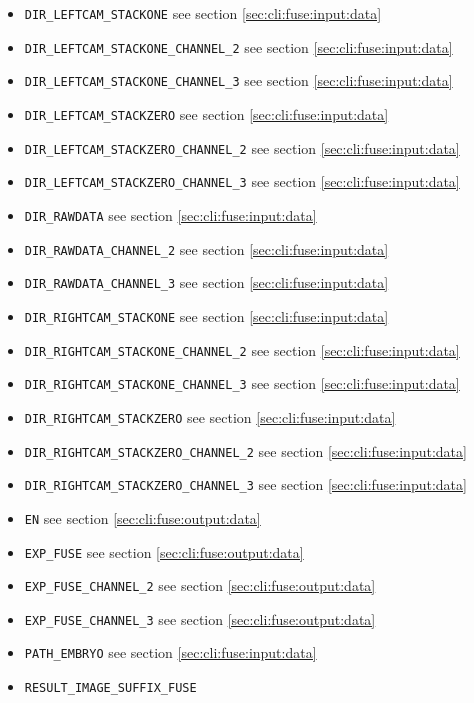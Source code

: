 \begin{itemize}
\itemsep -0.5ex
\item \texttt{DIR\_LEFTCAM\_STACKONE} see section \ref{sec:cli:fuse:input:data}
\item \texttt{DIR\_LEFTCAM\_STACKONE\_CHANNEL\_2} see section \ref{sec:cli:fuse:input:data}
\item \texttt{DIR\_LEFTCAM\_STACKONE\_CHANNEL\_3} see section \ref{sec:cli:fuse:input:data}
\item \texttt{DIR\_LEFTCAM\_STACKZERO} see section \ref{sec:cli:fuse:input:data}
\item \texttt{DIR\_LEFTCAM\_STACKZERO\_CHANNEL\_2} see section \ref{sec:cli:fuse:input:data}
\item \texttt{DIR\_LEFTCAM\_STACKZERO\_CHANNEL\_3} see section \ref{sec:cli:fuse:input:data}
\item \texttt{DIR\_RAWDATA} see section \ref{sec:cli:fuse:input:data}
\item \texttt{DIR\_RAWDATA\_CHANNEL\_2} see section \ref{sec:cli:fuse:input:data}
\item \texttt{DIR\_RAWDATA\_CHANNEL\_3} see section \ref{sec:cli:fuse:input:data}
\item \texttt{DIR\_RIGHTCAM\_STACKONE} see section \ref{sec:cli:fuse:input:data}
\item \texttt{DIR\_RIGHTCAM\_STACKONE\_CHANNEL\_2} see section \ref{sec:cli:fuse:input:data}
\item \texttt{DIR\_RIGHTCAM\_STACKONE\_CHANNEL\_3} see section \ref{sec:cli:fuse:input:data}
\item \texttt{DIR\_RIGHTCAM\_STACKZERO} see section \ref{sec:cli:fuse:input:data}
\item \texttt{DIR\_RIGHTCAM\_STACKZERO\_CHANNEL\_2} see section \ref{sec:cli:fuse:input:data}
\item \texttt{DIR\_RIGHTCAM\_STACKZERO\_CHANNEL\_3} see section \ref{sec:cli:fuse:input:data}
\item \texttt{EN} see section \ref{sec:cli:fuse:output:data}
\item \texttt{EXP\_FUSE} see section \ref{sec:cli:fuse:output:data}
\item \texttt{EXP\_FUSE\_CHANNEL\_2} see section \ref{sec:cli:fuse:output:data}
\item \texttt{EXP\_FUSE\_CHANNEL\_3} see section \ref{sec:cli:fuse:output:data}
\item \texttt{PATH\_EMBRYO} see section \ref{sec:cli:fuse:input:data}
\item \texttt{RESULT\_IMAGE\_SUFFIX\_FUSE}

\end{itemize}
